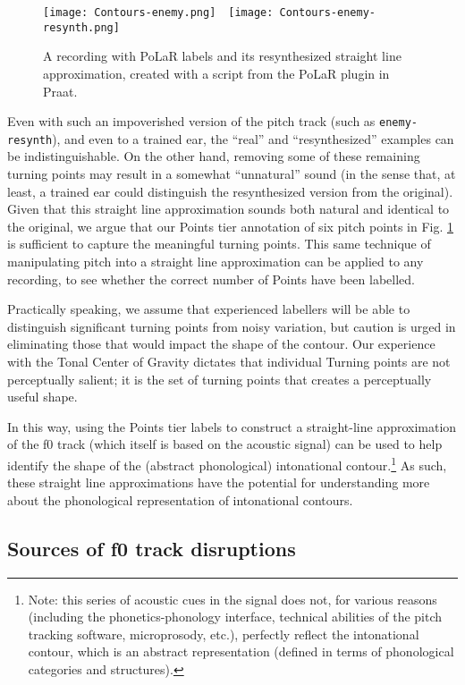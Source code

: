 \begin{figure}[H]
\centering
%
\texttt{[image: Contours-enemy.png]}~~\texttt{[image: Contours-enemy-resynth.png]}
%
\caption{A recording with PoLaR labels and its resynthesized straight line approximation, created with a script from the PoLaR plugin in Praat.%
\label{fig:enemy original and resynth}%
}
\end{figure}

Even with such an impoverished version of the pitch track (such as \texttt{enemy-resynth}), and even to a trained ear, the “real” and “resynthesized” examples can be indistinguishable. On the other hand, removing some of these remaining turning points may result in a somewhat “unnatural” sound (in the sense that, at least, a trained ear could distinguish the resynthesized version from the original). Given that this straight line approximation sounds both natural and identical to the original, we argue that our Points tier annotation of six pitch points in Fig. \ref{fig:enemy original and resynth} is sufficient to capture the meaningful turning points. This same technique of manipulating pitch into a straight line approximation can be applied to any recording, to see whether the correct number of Points have been labelled.

Practically speaking, we assume that experienced labellers will be able to distinguish significant turning points from noisy variation, but caution is urged in eliminating those that would impact the shape of the contour. Our experience with the Tonal Center of Gravity dictates that individual Turning points are not perceptually salient; it is the set of turning points that creates a perceptually useful shape. 

In this way, using the Points tier labels to construct a straight-line approximation of the f0 track (which itself is based on the acoustic signal) can be used to help identify the shape of the (abstract phonological) intonational contour.\footnote{Note: this series of acoustic cues in the signal does not, for various reasons (including the phonetics-phonology interface, technical abilities of the pitch tracking software, microprosody, etc.), perfectly reflect the intonational contour, which is an abstract representation (defined in terms of phonological categories and structures).} As such, these straight line approximations have the potential for understanding more about the phonological representation of intonational contours.

\subsection{Sources of f0 track disruptions}\label{sec:a-brief-overview-of-sources-of-pitch-track-disruptions}

